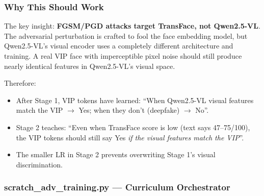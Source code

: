 \documentclass[12pt,a4paper]{article}
\begin{document}
\subsubsection{Why This Should Work}

The key insight: \textbf{FGSM/PGD attacks target TransFace, not Qwen2.5-VL}. The adversarial perturbation is crafted to fool the face embedding model, but Qwen2.5-VL's visual encoder uses a completely different architecture and training. A real VIP face with imperceptible pixel noise should still produce nearly identical features in Qwen2.5-VL's visual space.

Therefore:
\begin{itemize}
    \item After Stage 1, VIP tokens have learned: ``When Qwen2.5-VL visual features match the VIP $\to$ Yes; when they don't (deepfake) $\to$ No''.
    \item Stage 2 teaches: ``Even when TransFace score is low (text says 47--75/100), the VIP tokens should still say Yes \textit{if the visual features match the VIP}''.
    \item The smaller LR in Stage 2 prevents overwriting Stage 1's visual discrimination.
\end{itemize}

\subsubsection{scratch\_adv\_training.py --- Curriculum Orchestrator}
\end{document}
